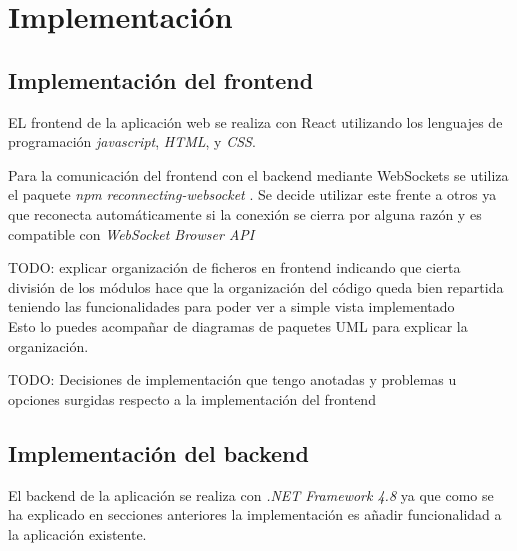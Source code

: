 \chapter{Implementación}


\section{Implementación del frontend}

EL frontend de la aplicación web se realiza con React utilizando los lenguajes de programación \textit{javascript}, \textit{HTML}, y \textit{CSS}.

Para la comunicación del frontend con el backend mediante WebSockets se utiliza el paquete \textit{npm} \textit{reconnecting-websocket} \cite{reconect-ws}. Se decide utilizar este frente a otros ya que reconecta automáticamente si la conexión se cierra por alguna razón y es compatible con \textit{WebSocket Browser API} \cite{api-ws-front}\newline

TODO: explicar organización de ficheros en frontend indicando que cierta división de los módulos hace que la organización del código queda bien repartida teniendo las funcionalidades para poder ver a simple vista implementado \\
Esto lo puedes acompañar de diagramas de paquetes UML para explicar la organización.


TODO: Decisiones de implementación que tengo anotadas y problemas u opciones surgidas respecto a la implementación del frontend \\




\section{Implementación del backend}

El backend de la aplicación se realiza con \textit{.NET Framework 4.8} ya que como se ha explicado en secciones anteriores la implementación es añadir funcionalidad a la aplicación existente. \newline

